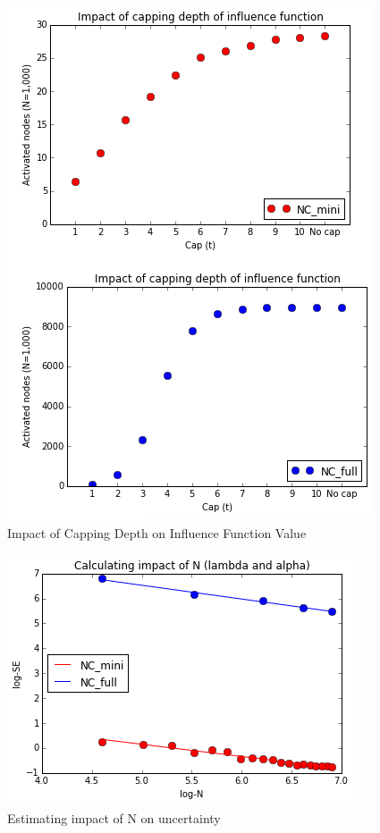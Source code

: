 \documentclass[11pt]{scrartcl} %
\begin{document}
\begin{enumerate}
\begin{figure}
\centering
\includegraphics[width=10 cm]{Capping}
\caption{Impact of Capping Depth on Influence Function Value}
\label{fig:LR}
\end{figure}


\begin{figure}
\centering
\includegraphics[width=10 cm]{LinearR}
\caption{Estimating impact of N on uncertainty}
\label{fig:LR}
\end{figure}


\end{enumerate}
\end{document}
